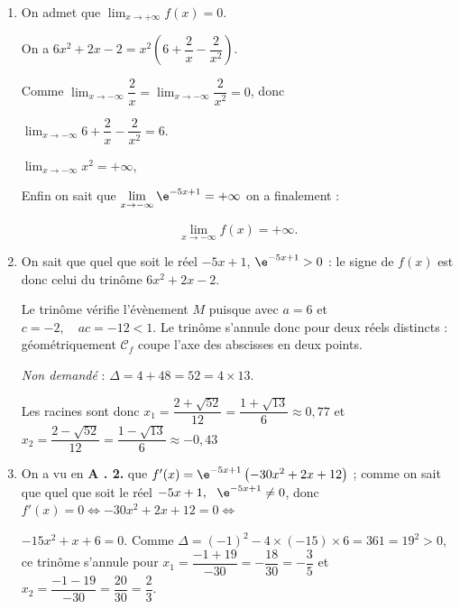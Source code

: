 \medskip

\begin{enumerate}
\item On admet que $\displaystyle\lim_{x \to + \infty} f(x) = 0$.


On a $6x^2 + 2x - 2 = x^2\left(6 + \dfrac{2}{x} - \dfrac{2}{x^2} \right)$.

Comme $\displaystyle\lim_{x \to - \infty} \dfrac{2}{x} = \displaystyle\lim_{x \to - \infty}\dfrac{2}{x^2} = 0$, donc 

$\displaystyle\lim_{x \to - \infty}6 + \dfrac{2}{x} - \dfrac{2}{x^2} = 6$.

$\displaystyle\lim_{x \to - \infty} x^2 = + \infty$, 

Enfin on sait que $\displaystyle\lim_{x \to - \infty}\e^{-5x+ 1} = + \infty$ on a finalement :

\[\displaystyle\lim_{x \to - \infty}f(x) = + \infty.\]
\item 
On sait que quel que soit le réel $- 5x + 1$, \: \: $\e^{- 5x + 1} > 0$ : le signe de $f(x)$ est donc celui du trinôme $6x^2 + 2x - 2$.

Le trinôme vérifie l'évènement $M$ puisque avec $a = 6$ et $c = - 2, \quad ac= - 12 < 1$.
Le trinôme s'annule donc pour deux réels distincts : géométriquement $\mathcal{C}_f$ coupe l'axe des abscisses en deux points.

\emph{Non demandé} : $\Delta = 4 + 48 = 52 = 4 \times 13$.

Les racines sont donc $x_1 = \dfrac{2+ \sqrt{52}}{12} = \dfrac{1 + \sqrt{13}}{6} \approx 0,77$ et $x_2 = \dfrac{2 - \sqrt{52}}{12} = \dfrac{1 - \sqrt{13}}{6} \approx - 0,43$
\item 
On a vu en \textbf{A . 2.} que $f'(x) = \e^{-5x+ 1}\left(-30x^2 + 2x + 12\right)$ ; comme on sait que quel que soit le réel $-5x + 1,\:\: \: \e^{-5x+ 1} \ne 0$, donc $f'(x) = 0 \iff -30x^2 + 2x + 12 = 0 \iff$

$- 15x^2 + x + 6 = 0$. Comme $\Delta = (-1)^2 - 4 \times (- 15) \times 6 = 361 = 19^2 > 0$, ce trinôme s'annule pour $x_1 = \dfrac{- 1 + 19}{- 30} = -\dfrac{18}{30} = -\dfrac35$ et $x_2 = \dfrac{- 1 - 19}{- 30} = \dfrac{20}{30} = \dfrac23$.


\end{enumerate}
